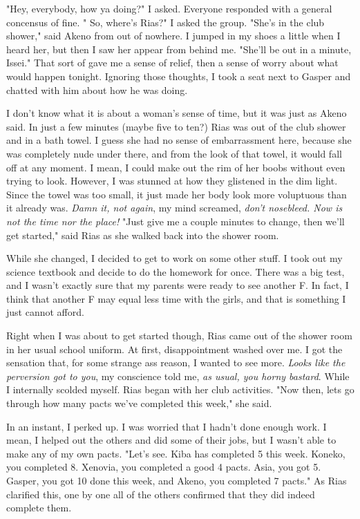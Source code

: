 \documentclass{article}
\begin{document}
"Hey, everybody, how ya doing?" I asked. Everyone responded with a general concensus of fine. " So, where's Rias?" I asked the group. "She's in the club shower," said Akeno from out of nowhere. I jumped in my shoes a little when I heard her, but then I saw her appear from behind me. "She'll be out in a minute, Issei." That sort of gave me a sense of relief, then a sense of worry about what would happen tonight. Ignoring those thoughts, I took a seat next to Gasper and chatted with him about how he was doing.

I don't know what it is about a woman's sense of time, but it was just as Akeno said. In just a few minutes (maybe five to ten?) Rias was out of the club shower and in a bath towel. I guess she had no sense of embarrassment here, because she was completely nude under there, and from the look of that towel, it would fall off at any moment. I mean, I could make out the rim of her boobs without even trying to look. However, I was stunned at how they glistened in the dim light. Since the towel was too small, it just made her body look more voluptuous than it already was. \emph{Damn it, not again}, my mind screamed, \emph{don't nosebleed. Now is not the time nor the place!} "Just give me a couple minutes to change, then we'll get started," said Rias as she walked back into the shower room.

While she changed, I decided to get to work on some other stuff. I took out my science textbook and decide to do the homework for once. There was a big test, and I wasn't exactly sure that my parents were ready to see another F. In fact, I think that another F may equal less time with the girls, and that is something I just cannot afford.

Right when I was about to get started though, Rias came out of the shower room in her usual school uniform. At first, disappointment washed over me. I got the sensation that, for some strange ass reason, I wanted to see more. \emph{Looks like the perversion got to you}, my conscience told me, \emph{as usual, you horny bastard}. While I internally scolded myself. Rias began with her club activities. "Now then, lets go through how many pacts we've completed this week," she said.

In an instant, I perked up. I was worried that I hadn't done enough work. I mean, I helped out the others and did some of their jobs, but I wasn't able to make any of my own pacts. "Let's see. Kiba has completed 5 this week. Koneko, you completed 8. Xenovia, you completed a good 4 pacts. Asia, you got 5. Gasper, you got 10 done this week, and Akeno, you completed 7 pacts." As Rias clarified this, one by one all of the others confirmed that they did indeed complete them.
\end{document}
